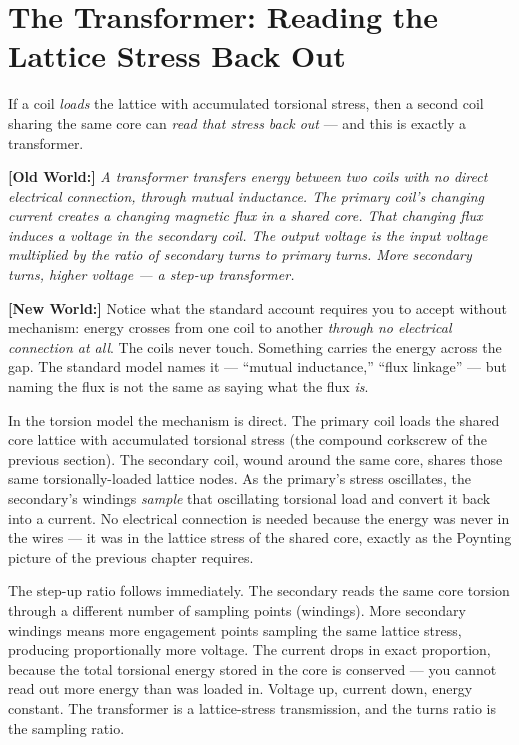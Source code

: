 \documentclass[11pt, letterpaper, openany]{book}
\newcommand{\oldworld}[1]{\noindent\textbf{\color{goldseal}[Old World:]}
  \textit{#1}\medskip}
\newcommand{\newworldcmd}[1]{\noindent\textbf{\color{kishblue}[New World:]}
  #1\medskip}
\begin{document}
\section{The Transformer: Reading the Lattice Stress Back Out}
 
If a coil \emph{loads} the lattice with accumulated torsional stress, then
a second coil sharing the same core can \emph{read that stress back out} ---
and this is exactly a transformer.
 
\oldworld{A transformer transfers energy between two coils with no direct
electrical connection, through mutual inductance. The primary coil's
changing current creates a changing magnetic flux in a shared core. That
changing flux induces a voltage in the secondary coil. The output voltage
is the input voltage multiplied by the ratio of secondary turns to primary
turns. More secondary turns, higher voltage --- a step-up transformer.}
 
\newworldcmd{Notice what the standard account requires you to accept
without mechanism: energy crosses from one coil to another \emph{through no
electrical connection at all}. The coils never touch. Something carries the
energy across the gap. The standard model names it --- ``mutual inductance,''
``flux linkage'' --- but naming the flux is not the same as saying what the
flux \emph{is}.
 
In the torsion model the mechanism is direct. The primary coil loads the
shared core lattice with accumulated torsional stress (the compound
corkscrew of the previous section). The secondary coil, wound around the
same core, shares those same torsionally-loaded lattice nodes. As the
primary's stress oscillates, the secondary's windings \emph{sample} that
oscillating torsional load and convert it back into a current. No electrical
connection is needed because the energy was never in the wires --- it was in
the lattice stress of the shared core, exactly as the Poynting picture of
the previous chapter requires.
 
The step-up ratio follows immediately. The secondary reads the same core
torsion through a different number of sampling points (windings). More
secondary windings means more engagement points sampling the same lattice
stress, producing proportionally more voltage. The current drops in exact
proportion, because the total torsional energy stored in the core is
conserved --- you cannot read out more energy than was loaded in. Voltage
up, current down, energy constant. The transformer is a lattice-stress
transmission, and the turns ratio is the sampling ratio.}
 
\end{document}
